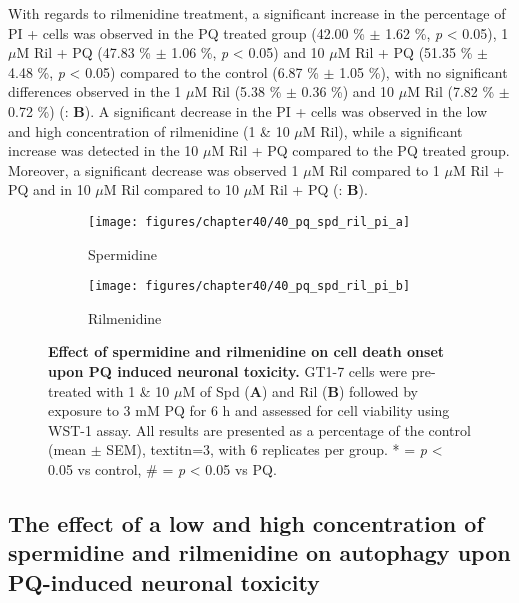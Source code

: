 With regards to rilmenidine treatment, a significant increase in the percentage of PI + cells was observed in the PQ treated group (42.00 \% $\pm$ 1.62 \%, \textit{p} < 0.05), 1 $\mu$M Ril + PQ (47.83 \% $\pm$ 1.06 \%, \textit{p} < 0.05) and 10 $\mu$M Ril + PQ (51.35 \% $\pm$ 4.48 \%, \textit{p} < 0.05) compared to the control (6.87 \% $\pm$ 1.05 \%), with no significant differences observed in the 1 $\mu$M Ril (5.38 \% $\pm$ 0.36 \%) and 10 $\mu$M Ril (7.82 \% $\pm$ 0.72 \%) (: \textbf{B}). A significant decrease in the PI + cells was observed in the low and high concentration of rilmenidine (1 \& 10 $\mu$M Ril), while a significant increase was detected in the 10 $\mu$M Ril + PQ compared to the PQ treated group.  Moreover, a significant decrease was observed 1 $\mu$M Ril compared to 1 $\mu$M Ril + PQ and in 10 $\mu$M Ril compared to 10 $\mu$M Ril + PQ (: \textbf{B}).

\begin{figure}[!htbp]
  \center
  \begin{subfigure}[b]{0.495\linewidth}
    \texttt{[image: figures/chapter40/40\_pq\_spd\_ril\_pi\_a]}
    \caption{Spermidine}
  \end{subfigure}
  \begin{subfigure}[b]{0.495\linewidth}
    \texttt{[image: figures/chapter40/40\_pq\_spd\_ril\_pi\_b]}
    \caption{Rilmenidine}
  \end{subfigure}
  \caption[Effect of spermidine and rilmenidine on cell death onset upon PQ induced neuronal toxicity]{\textbf{Effect of spermidine and rilmenidine on cell death onset upon PQ induced neuronal toxicity.} GT1-7 cells were pre-treated with 1 \& 10 $\mu$M of Spd (\textbf{A}) and Ril (\textbf{B}) followed by exposure to 3 mM PQ for 6 h and assessed for cell viability using WST-1 assay. All results are presented as a percentage of the control (mean $\pm$ SEM), textit{n}=3, with 6 replicates per group. * = \textit{p} < 0.05 vs control, \# = \textit{p} < 0.05 vs PQ.}
  \label{fig:40_pq_spd_ril_pi_a}
\end{figure}


\subsection{The effect of a low and high concentration of spermidine and rilmenidine on autophagy upon PQ-induced neuronal toxicity} 
